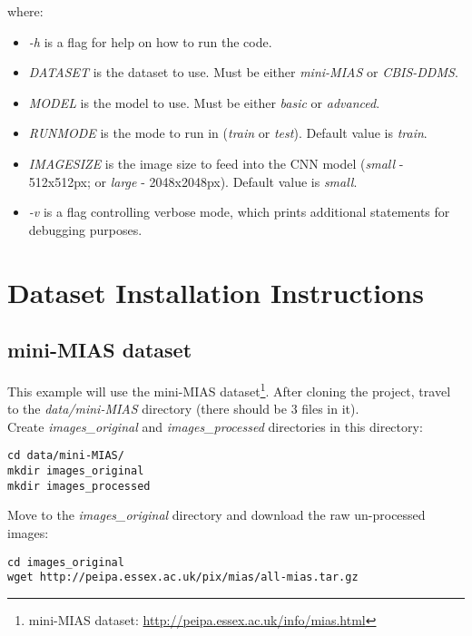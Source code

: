 where:
\begin{itemize}
    \item \textit{-h} is a  flag for help on how to run the code.
    \item \textit{DATASET} is the dataset to use. Must be either \textit{mini-MIAS} or \textit{CBIS-DDMS}.
    \item \textit{MODEL} is the model to use. Must be either \textit{basic} or \textit{advanced}.
    \item \textit{RUNMODE} is the mode to run in (\textit{train} or \textit{test}). Default value is \textit{train}.
    \item \textit{IMAGESIZE} is the image size to feed into the CNN model (\textit{small} - 512x512px; or \textit{large} - 2048x2048px). Default value is \textit{small}.
    \item \textit{-v} is a flag controlling verbose mode, which prints additional statements for debugging purposes.
\end{itemize}


\section{Dataset Installation Instructions}

\subsection{mini-MIAS dataset}

This example will use the mini-MIAS dataset\footnote{mini-MIAS dataset: \url{http://peipa.essex.ac.uk/info/mias.html}}. After cloning the project, travel to the \textit{data/mini-MIAS} directory (there should be 3 files in it).\\

Create \textit{images\_original} and \textit{images\_processed} directories in this directory: 

\begin{lstlisting}
cd data/mini-MIAS/
mkdir images_original
mkdir images_processed
\end{lstlisting}

Move to the \textit{images\_original} directory and download the raw un-processed images:

\begin{lstlisting}
cd images_original
wget http://peipa.essex.ac.uk/pix/mias/all-mias.tar.gz
\end{lstlisting}

